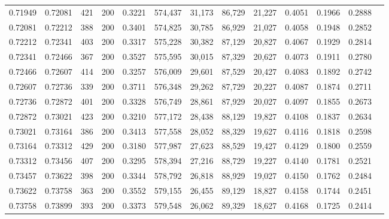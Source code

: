 \begin{tabular}{rrrrrrrrrrrrr}
0.71949 & 0.72081 &   421 & 200 &                                     0.3221 & 574,437 &  31,173 &  86,729 &  21,227 & 0.4051 & 0.1966 & 0.2888 \\
0.72081 & 0.72212 &   388 & 200 &                                     0.3401 & 574,825 &  30,785 &  86,929 &  21,027 & 0.4058 & 0.1948 & 0.2852 \\
0.72212 & 0.72341 &   403 & 200 &                                     0.3317 & 575,228 &  30,382 &  87,129 &  20,827 & 0.4067 & 0.1929 & 0.2814 \\
0.72341 & 0.72466 &   367 & 200 &                                     0.3527 & 575,595 &  30,015 &  87,329 &  20,627 & 0.4073 & 0.1911 & 0.2780 \\
0.72466 & 0.72607 &   414 & 200 &                                     0.3257 & 576,009 &  29,601 &  87,529 &  20,427 & 0.4083 & 0.1892 & 0.2742 \\
0.72607 & 0.72736 &   339 & 200 &                                     0.3711 & 576,348 &  29,262 &  87,729 &  20,227 & 0.4087 & 0.1874 & 0.2711 \\
0.72736 & 0.72872 &   401 & 200 &                                     0.3328 & 576,749 &  28,861 &  87,929 &  20,027 & 0.4097 & 0.1855 & 0.2673 \\
0.72872 & 0.73021 &   423 & 200 &                                     0.3210 & 577,172 &  28,438 &  88,129 &  19,827 & 0.4108 & 0.1837 & 0.2634 \\
0.73021 & 0.73164 &   386 & 200 &                                     0.3413 & 577,558 &  28,052 &  88,329 &  19,627 & 0.4116 & 0.1818 & 0.2598 \\
0.73164 & 0.73312 &   429 & 200 &                                     0.3180 & 577,987 &  27,623 &  88,529 &  19,427 & 0.4129 & 0.1800 & 0.2559 \\
0.73312 & 0.73456 &   407 & 200 &                                     0.3295 & 578,394 &  27,216 &  88,729 &  19,227 & 0.4140 & 0.1781 & 0.2521 \\
0.73457 & 0.73622 &   398 & 200 &                                     0.3344 & 578,792 &  26,818 &  88,929 &  19,027 & 0.4150 & 0.1762 & 0.2484 \\
0.73622 & 0.73758 &   363 & 200 &                                     0.3552 & 579,155 &  26,455 &  89,129 &  18,827 & 0.4158 & 0.1744 & 0.2451 \\
0.73758 & 0.73899 &   393 & 200 &                                     0.3373 & 579,548 &  26,062 &  89,329 &  18,627 & 0.4168 & 0.1725 & 0.2414 \\

\end{tabular}
